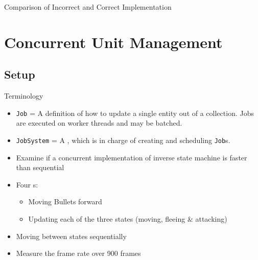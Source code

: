 \begin{frame}[fragile]{\secname}{\subsecname}
	Comparison of Incorrect and Correct Implementation
\end{frame}

\section{Concurrent Unit Management}
\subsection{Setup}
\begin{frame}{\secname}{\subsecname}
	Terminology
	\begin{itemize}
		\item<1-> \texttt{Job} = A definition of how to update a single entity out of a collection. Jobs are executed on worker threads and may be batched.
		\item<2-> \texttt{JobSystem} = A , which is in charge of creating and scheduling \texttt{Job}s.
	\end{itemize}
\end{frame}

\begin{frame}{\secname}{\subsecname}
	\begin{itemize}
		\item<1-> Examine if a concurrent implementation of inverse state machine is faster than sequential
		\item<2-> Four s:
		\begin{itemize}
			\item Moving Bullets forward
			\item Updating each of the three states (moving, fleeing \& attacking)
		\end{itemize}
		\item<3-> Moving between states sequentially
		\item<4-> Measure the frame rate over 900 frames
	\end{itemize}
\end{frame}

